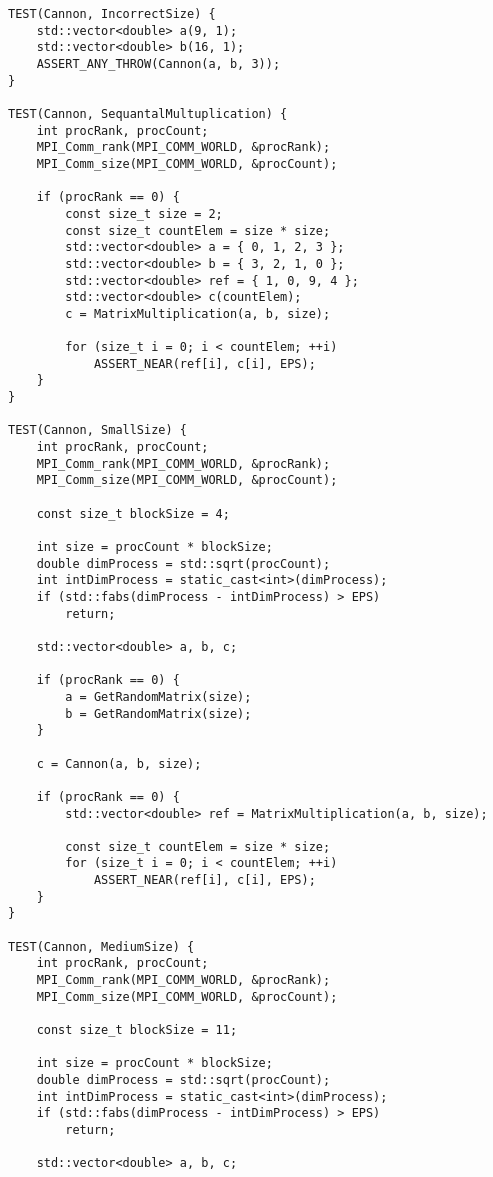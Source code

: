 \documentclass{report}
\begin{document}
\begin{lstlisting}
TEST(Cannon, IncorrectSize) {
    std::vector<double> a(9, 1);
    std::vector<double> b(16, 1);
    ASSERT_ANY_THROW(Cannon(a, b, 3));
}

TEST(Cannon, SequantalMultuplication) {
    int procRank, procCount;
    MPI_Comm_rank(MPI_COMM_WORLD, &procRank);
    MPI_Comm_size(MPI_COMM_WORLD, &procCount);

    if (procRank == 0) {
        const size_t size = 2;
        const size_t countElem = size * size;
        std::vector<double> a = { 0, 1, 2, 3 };
        std::vector<double> b = { 3, 2, 1, 0 };
        std::vector<double> ref = { 1, 0, 9, 4 };
        std::vector<double> c(countElem);
        c = MatrixMultiplication(a, b, size);

        for (size_t i = 0; i < countElem; ++i)
            ASSERT_NEAR(ref[i], c[i], EPS);
    }
}

TEST(Cannon, SmallSize) {
    int procRank, procCount;
    MPI_Comm_rank(MPI_COMM_WORLD, &procRank);
    MPI_Comm_size(MPI_COMM_WORLD, &procCount);

    const size_t blockSize = 4;

    int size = procCount * blockSize;
    double dimProcess = std::sqrt(procCount);
    int intDimProcess = static_cast<int>(dimProcess);
    if (std::fabs(dimProcess - intDimProcess) > EPS)
        return;

    std::vector<double> a, b, c;

    if (procRank == 0) {
        a = GetRandomMatrix(size);
        b = GetRandomMatrix(size);
    }

    c = Cannon(a, b, size);

    if (procRank == 0) {
        std::vector<double> ref = MatrixMultiplication(a, b, size);

        const size_t countElem = size * size;
        for (size_t i = 0; i < countElem; ++i)
            ASSERT_NEAR(ref[i], c[i], EPS);
    }
}

TEST(Cannon, MediumSize) {
    int procRank, procCount;
    MPI_Comm_rank(MPI_COMM_WORLD, &procRank);
    MPI_Comm_size(MPI_COMM_WORLD, &procCount);

    const size_t blockSize = 11;

    int size = procCount * blockSize;
    double dimProcess = std::sqrt(procCount);
    int intDimProcess = static_cast<int>(dimProcess);
    if (std::fabs(dimProcess - intDimProcess) > EPS)
        return;

    std::vector<double> a, b, c;


\end{lstlisting}
\end{document}
